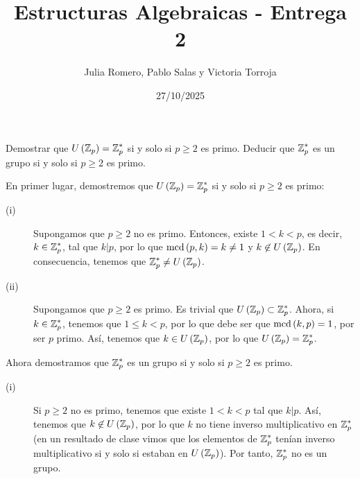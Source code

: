 \documentclass{article}
\begin{document}
\title{Estructuras Algebraicas - Entrega 2}
\author{Julia Romero, Pablo Salas y Victoria Torroja}
\date{27/10/2025}

\maketitle

\begin{ej}
Demostrar que $\displaystyle U\left(\mathbb{Z}_{p}\right) = \mathbb{Z}_{p}^{*} $ si y solo si $\displaystyle p \geq 2 $ es primo. Deducir que $\displaystyle \mathbb{Z}^{*}_{p} $ es un grupo si y solo si $\displaystyle p \geq 2 $ es primo.
\end{ej}

\begin{sol}
En primer lugar, demostremos que $\displaystyle U\left(\mathbb{Z}_{p}\right) = \mathbb{Z}_{p}^{*} $ si y solo si $\displaystyle p \geq 2 $ es primo:
\begin{description}
\item[(i)] Supongamos que $\displaystyle p\geq 2 $ no es primo. Entonces, existe $\displaystyle 1 < k < p $, es decir, $\displaystyle k \in \mathbb{Z}_{p}^{*} $, tal que $\displaystyle k | p $, por lo que $\displaystyle \text{mcd}\left(p,k\right) = k \neq 1 $ y $\displaystyle k \not\in U\left(\mathbb{Z}_{p}\right) $. En consecuencia, tenemos que $\displaystyle \mathbb{Z}^{*}_{p} \neq U\left(\mathbb{Z}_{p}\right) $.
\item[(ii)] Supongamos que $\displaystyle p \geq 2 $ es primo. Es trivial que $\displaystyle U\left(\mathbb{Z}_{p}\right) \subset \mathbb{Z}_{p}^{*} $. Ahora, si $\displaystyle k \in \mathbb{Z}_{p}^{*} $, tenemos que $\displaystyle 1 \leq k < p $, por lo que debe ser que $\displaystyle \text{mcd}\left(k,p\right) = 1 $, por ser $\displaystyle p $ primo. Así, tenemos que $\displaystyle k \in U\left(\mathbb{Z}_{p}\right) $, por lo que $\displaystyle U\left(\mathbb{Z}_{p}\right) = \mathbb{Z}_{p}^{*} $.
\end{description}
Ahora demostramos que $\displaystyle \mathbb{Z}_{p}^{*} $ es un grupo si y solo si $\displaystyle p \geq 2 $ es primo.
\begin{description}
\item[(i)] Si $\displaystyle p \geq 2 $ no es primo, tenemos que existe $\displaystyle 1 < k < p $ tal que $\displaystyle k | p $. Así, tenemos que $\displaystyle k \not\in U\left(\mathbb{Z}_{p}\right)$, por lo que $\displaystyle k $ no tiene inverso multiplicativo en $\displaystyle \mathbb{Z}_{p}^{*} $ (en un resultado de clase vimos que los elementos de $\displaystyle \mathbb{Z}^{*}_{p} $ tenían inverso multiplicativo si y solo si estaban en $\displaystyle U\left(\mathbb{Z}_{p}\right) $). Por tanto, $\displaystyle \mathbb{Z}_{p}^{*} $ no es un grupo.

\end{description}
\end{sol}
\end{document}
